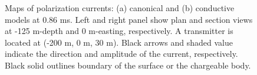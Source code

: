 \documentclass[extra,mreferee]{gji}
\begin{document}
\begin{figure}
  \caption{Maps of polarization currents: (a) canonical and (b) conductive models at 0.86 ms. Left and right panel show plan and section views at -125 m-depth and 0 m-easting, respectively. A transmitter is located at (-200 m, 0 m, 30 m). Black arrows and shaded value indicate the direction and amplitude of the current, respectively. Black solid outlines boundary of the surface or the chargeable body.}
  \label{F:Polarizationcurrent_early}
\end{figure}
\end{document}
